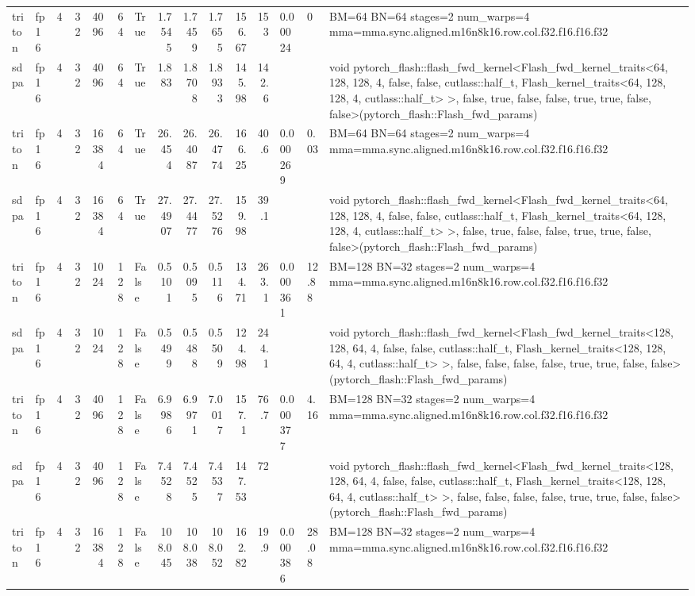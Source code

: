 \begin{table}[htbp]
\begin{tabular}{llrrrrlrrrrrlll}
    triton & fp16 & 4 & 32 & 4096 & 64 & True & 1.7545 & 1.7459 & 1.7655 & 156.67 & 153 & 0.00024 & 0 & BM=64 BN=64 stages=2 num\_warps=4 mma=mma.sync.aligned.m16n8k16.row.col.f32.f16.f16.f32 \\
    sdpa & fp16 & 4 & 32 & 4096 & 64 & True & 1.883 & 1.8708 & 1.8933 & 145.98 & 142.6 &  &  & void pytorch\_flash::flash\_fwd\_kernel<Flash\_fwd\_kernel\_traits<64, 128, 128, 4, false, false, cutlass::half\_t, Flash\_kernel\_traits<64, 128, 128, 4, cutlass::half\_t> >, false, true, false, false, true, true, false, false>(pytorch\_flash::Flash\_fwd\_params) \\
    triton & fp16 & 4 & 32 & 16384 & 64 & True & 26.454 & 26.4087 & 26.4774 & 166.25 & 40.6 & 0.000269 & 0.03 & BM=64 BN=64 stages=2 num\_warps=4 mma=mma.sync.aligned.m16n8k16.row.col.f32.f16.f16.f32 \\
    sdpa & fp16 & 4 & 32 & 16384 & 64 & True & 27.4907 & 27.4477 & 27.5276 & 159.98 & 39.1 &  &  & void pytorch\_flash::flash\_fwd\_kernel<Flash\_fwd\_kernel\_traits<64, 128, 128, 4, false, false, cutlass::half\_t, Flash\_kernel\_traits<64, 128, 128, 4, cutlass::half\_t> >, false, true, false, false, true, true, false, false>(pytorch\_flash::Flash\_fwd\_params) \\
    triton & fp16 & 4 & 32 & 1024 & 128 & False & 0.5101 & 0.5095 & 0.5116 & 134.71 & 263.1 & 0.000361 & 12.88 & BM=128 BN=32 stages=2 num\_warps=4 mma=mma.sync.aligned.m16n8k16.row.col.f32.f16.f16.f32 \\
    sdpa & fp16 & 4 & 32 & 1024 & 128 & False & 0.5499 & 0.5488 & 0.5509 & 124.98 & 244.1 &  &  & void pytorch\_flash::flash\_fwd\_kernel<Flash\_fwd\_kernel\_traits<128, 128, 64, 4, false, false, cutlass::half\_t, Flash\_kernel\_traits<128, 128, 64, 4, cutlass::half\_t> >, false, false, false, false, true, true, false, false>(pytorch\_flash::Flash\_fwd\_params) \\
    triton & fp16 & 4 & 32 & 4096 & 128 & False & 6.9986 & 6.9971 & 7.0017 & 157.1 & 76.7 & 0.000377 & 4.16 & BM=128 BN=32 stages=2 num\_warps=4 mma=mma.sync.aligned.m16n8k16.row.col.f32.f16.f16.f32 \\
    sdpa & fp16 & 4 & 32 & 4096 & 128 & False & 7.4528 & 7.4525 & 7.4537 & 147.53 & 72 &  &  & void pytorch\_flash::flash\_fwd\_kernel<Flash\_fwd\_kernel\_traits<128, 128, 64, 4, false, false, cutlass::half\_t, Flash\_kernel\_traits<128, 128, 64, 4, cutlass::half\_t> >, false, false, false, false, true, true, false, false>(pytorch\_flash::Flash\_fwd\_params) \\
    triton & fp16 & 4 & 32 & 16384 & 128 & False & 108.045 & 108.038 & 108.052 & 162.82 & 19.9 & 0.000386 & 28.08 & BM=128 BN=32 stages=2 num\_warps=4 mma=mma.sync.aligned.m16n8k16.row.col.f32.f16.f16.f32 \\

\end{tabular}
\end{table}
